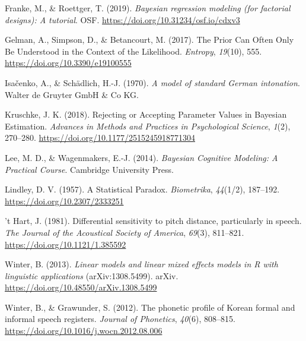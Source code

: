 \documentclass[
  doc,
  longtable,
  nolmodern,
  notxfonts,
  notimes,
  colorlinks=true,linkcolor=blue,citecolor=blue,urlcolor=blue]{apa7}
\newlength{\cslhangindent}
\newenvironment{CSLReferences}[2] %
 {\begin{list}{}{%
  \setlength{\itemindent}{0pt}
  \setlength{\leftmargin}{0pt}
  \setlength{\parsep}{0pt}
  \ifodd #1
   \setlength{\leftmargin}{\cslhangindent}
   \setlength{\itemindent}{-1\cslhangindent}
  \fi
  \setlength{\itemsep}{#2\baselineskip}}}
 {\end{list}}
\begin{document}
\label{refs}
\begin{CSLReferences}{1}{0}
Franke, M., \& Roettger, T. (2019). \emph{Bayesian regression modeling
(for factorial designs): {A} tutorial}. OSF.
\url{https://doi.org/10.31234/osf.io/cdxv3}

Gelman, A., Simpson, D., \& Betancourt, M. (2017). The {Prior Can Often
Only Be Understood} in the {Context} of the {Likelihood}.
\emph{Entropy}, \emph{19}(10), 555.
\url{https://doi.org/10.3390/e19100555}

Isačenko, A., \& Schädlich, H.-J. (1970). \emph{A model of standard
{German} intonation}. Walter de Gruyter GmbH \& Co KG.

Kruschke, J. K. (2018). Rejecting or {Accepting Parameter Values} in
{Bayesian Estimation}. \emph{Advances in Methods and Practices in
Psychological Science}, \emph{1}(2), 270--280.
\url{https://doi.org/10.1177/2515245918771304}

Lee, M. D., \& Wagenmakers, E.-J. (2014). \emph{Bayesian {Cognitive
Modeling}: {A Practical Course}}. Cambridge University Press.

Lindley, D. V. (1957). A {Statistical Paradox}. \emph{Biometrika},
\emph{44}(1/2), 187--192. \url{https://doi.org/10.2307/2333251}

't Hart, J. (1981). Differential sensitivity to pitch distance,
particularly in speech. \emph{The Journal of the Acoustical Society of
America}, \emph{69}(3), 811--821. \url{https://doi.org/10.1121/1.385592}

Winter, B. (2013). \emph{Linear models and linear mixed effects models
in {R} with linguistic applications} (arXiv:1308.5499). arXiv.
\url{https://doi.org/10.48550/arXiv.1308.5499}

Winter, B., \& Grawunder, S. (2012). The phonetic profile of {Korean}
formal and informal speech registers. \emph{Journal of Phonetics},
\emph{40}(6), 808--815. \url{https://doi.org/10.1016/j.wocn.2012.08.006}

\end{CSLReferences}
\end{document}
